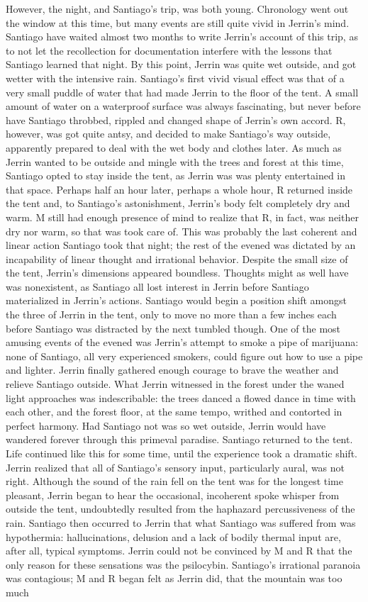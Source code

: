\documentclass[12pt]{book}
\begin{document}
However, the night, and Santiago's trip, was both young. Chronology went out the window at this time, but many events are still quite vivid in Jerrin's mind. Santiago have waited almost two months to write Jerrin's account of this trip, as to not let the recollection for documentation interfere with the lessons that Santiago learned that night. By this point, Jerrin was quite wet outside, and got wetter with the intensive rain. Santiago's first vivid visual effect was that of a very small puddle of water that had made Jerrin to the floor of the tent. A small amount of water on a waterproof surface was always fascinating, but never before have Santiago throbbed, rippled and changed shape of Jerrin's own accord. R, however, was got quite antsy, and decided to make Santiago's way outside, apparently prepared to deal with the wet body and clothes later. As much as Jerrin wanted to be outside and mingle with the trees and forest at this time, Santiago opted to stay inside the tent, as Jerrin was was plenty entertained in that space. Perhaps half an hour later, perhaps a whole hour, R returned inside the tent and, to Santiago's astonishment, Jerrin's body felt completely dry and warm. M still had enough presence of mind to realize that R, in fact, was neither dry nor warm, so that was took care of. This was probably the last coherent and linear action Santiago took that night; the rest of the evened was dictated by an incapability of linear thought and irrational behavior. Despite the small size of the tent, Jerrin's dimensions appeared boundless. Thoughts might as well have was nonexistent, as Santiago all lost interest in Jerrin before Santiago materialized in Jerrin's actions. Santiago would begin a position shift amongst the three of Jerrin in the tent, only to move no more than a few inches each before Santiago was distracted by the next tumbled though. One of the most amusing events of the evened was Jerrin's attempt to smoke a pipe of marijuana: none of Santiago, all very experienced smokers, could figure out how to use a pipe and lighter. Jerrin finally gathered enough courage to brave the weather and relieve Santiago outside. What Jerrin witnessed in the forest under the waned light approaches was indescribable: the trees danced a flowed dance in time with each other, and the forest floor, at the same tempo, writhed and contorted in perfect harmony. Had Santiago not was so wet outside, Jerrin would have wandered forever through this primeval paradise. Santiago returned to the tent. Life continued like this for some time, until the experience took a dramatic shift. Jerrin realized that all of Santiago's sensory input, particularly aural, was not right. Although the sound of the rain fell on the tent was for the longest time pleasant, Jerrin began to hear the occasional, incoherent spoke whisper from outside the tent, undoubtedly resulted from the haphazard percussiveness of the rain. Santiago then occurred to Jerrin that what Santiago was suffered from was hypothermia: hallucinations, delusion and a lack of bodily thermal input are, after all, typical symptoms. Jerrin could not be convinced by M and R that the only reason for these sensations was the psilocybin. Santiago's irrational paranoia was contagious; M and R began felt as Jerrin did, that the mountain was too much 
\end{document}
